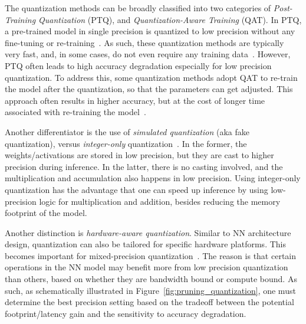 The quantization methods can be broadly classified into two categories of \emph{Post-Training Quantization} (PTQ),
and \emph{Quantization-Aware Training} (QAT). In PTQ, a pre-trained model in single precision is quantized to low precision
without any fine-tuning or re-training~\cite{banner2018post,meller2019same,choukroun2019low,zhao2019improving,fang2020post,fang2020near,lee2018quantization,nagel2019data,cai2020zeroq,hawks2021ps}. As such, these quantization methods are typically very fast, and, in some cases, do not even require any training data~\cite{cai2020zeroq, haroush2020knowledge,nagel2019data}.
However, PTQ often leads to high accuracy degradation especially for low precision quantization.
To address this, some quantization methods adopt QAT to re-train the model after the quantization, so that the parameters can
get adjusted. This approach often results in higher accuracy, but at the cost of longer
time associated with re-training the model~\cite{courbariaux2015binaryconnect,lin2015neural,hubara2016binarized,rastegari2016xnor,zhou2016dorefa,zhu2016trained,cai2017deep,hou2016loss,gysel2018ristretto,huang2021codenet,zhou2018explicit}.

Another differentiator is the use of \emph{simulated quantization} (aka fake quantization), versus \emph{integer-only} quantization~\cite{jacob2018quantization,yao2020hawqv3,kim2021bert,lin2016fixed}. In the former, 
the weights/activations are stored in low precision, but they are cast to higher precision during
inference. In the latter, there is no casting involved, and the multiplication and accumulation also happens
in low precision. Using integer-only quantization has the advantage that one can speed up
inference by using low-precision logic for multiplication and addition, besides reducing the memory footprint of the model.


Another distinction is \emph{hardware-aware quantization}. 
Similar to NN architecture design, quantization can also be tailored for specific hardware platforms.
This becomes important for mixed-precision quantization~\cite{zhou2018adaptive, wang2018haq, wu2018mixed, hawq, shen2020q, hawqv2, dong2021hao, yao2020hawqv3}.
The reason is that certain operations in the NN model may benefit more from low precision
quantization than others, based on whether they are bandwidth bound or compute bound.
As such, as schematically
illustrated in Figure~\ref{fig:pruning_quantization},
one must determine the best precision setting based on the tradeoff between the potential footprint/latency gain and the sensitivity to accuracy degradation.

